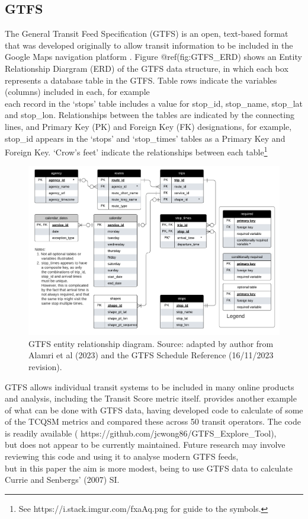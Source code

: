 \documentclass[preprint, 3p,
authoryear]{elsarticle} %
\begin{document}
\hypertarget{gtfs}{%
\subsection{GTFS}\label{gtfs}}

The General Transit Feed Specification (GTFS) is an open, text-based
format that was developed originally to allow transit information to be
included in the Google Maps navigation platform \citep{GTFS}. Figure
@ref(fig:GTFS\_ERD) shows an Entity Relationship Diargram (ERD) of the
GTFS data structure, in which each box represents a database table in
the GTFS. Table rows indicate the variables (columns) included in each,
for example\\
each record in the `stops' table includes a value for stop\_id,
stop\_name, stop\_lat and stop\_lon. Relationships between the tables
are indicated by the connecting lines, and Primary Key (PK) and Foreign
Key (FK) designations, for example, stop\_id appears in the `stops' and
`stop\_times' tables as a Primary Key and Foreign Key. `Crow's feet'
indicate the relationships between each table\footnote{ See
  https://i.stack.imgur.com/fxaAq.png for guide to the symbols.}

\begin{figure}
\includegraphics[width=1\linewidth]{graphics/GTFS} \caption{GTFS entity relationship diagram. Source: adapted by author from Alamri et al (2023) and the GTFS Schedule Reference (16/11/2023 revision).}\label{fig:GTFS_ERD}
\end{figure}

GTFS allows individual transit systems to be included in many online
products and analysis, including the Transit Score metric itself.
\citet{Wong:2013aa} provides another example of what can be done with
GTFS data, having developed code to calculate of some of the TCQSM
metrics and compared these across 50 transit operators. The
\citet{Wong:2013aa} code is readily available (
https://github.com/jcwong86/GTFS\_Explore\_Tool),\\
but does not appear to be currently maintained. Future research may
involve reviewing this code and using it to analyse modern GTFS feeds,\\
but in this paper the aim is more modest, being to use GTFS data to
calculate Currie and Senbergs' (2007) SI.
\end{document}
